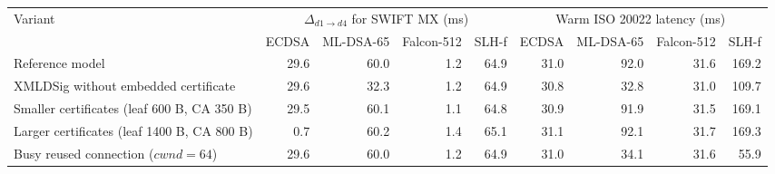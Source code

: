 \begin{tabular}{@{}lrrrrrrrr@{}}
\toprule
Variant & \multicolumn{4}{c}{$\Delta_{d1\to d4}$ for SWIFT MX (ms)} & \multicolumn{4}{c}{Warm ISO 20022 latency (ms)} \\
\cmidrule(lr){2-5}\cmidrule(lr){6-9}
 & ECDSA & ML-DSA-65 & Falcon-512 & SLH-f & ECDSA & ML-DSA-65 & Falcon-512 & SLH-f \\
\midrule
Reference model & 29.6 & 60.0 & 1.2 & 64.9 & 31.0 & 92.0 & 31.6 & 169.2 \\
XMLDSig without embedded certificate & 29.6 & 32.3 & 1.2 & 64.9 & 30.8 & 32.8 & 31.0 & 109.7 \\
Smaller certificates (leaf 600 B, CA 350 B) & 29.5 & 60.1 & 1.1 & 64.8 & 30.9 & 91.9 & 31.5 & 169.1 \\
Larger certificates (leaf 1400 B, CA 800 B) & 0.7 & 60.2 & 1.4 & 65.1 & 31.1 & 92.1 & 31.7 & 169.3 \\
Busy reused connection ($cwnd=64$) & 29.6 & 60.0 & 1.2 & 64.9 & 31.0 & 34.1 & 31.6 & 55.9 \\
\bottomrule
\end{tabular}
